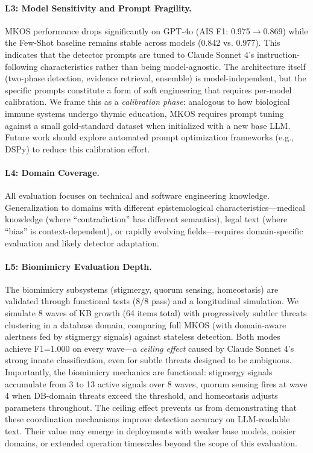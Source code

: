 \documentclass[11pt]{article}
\begin{document}
\paragraph{L3: Model Sensitivity and Prompt Fragility.} MKOS performance drops significantly on GPT-4o (AIS F1: 0.975$\to$0.869) while the Few-Shot baseline remains stable across models (0.842 vs. 0.977). This indicates that the detector prompts are tuned to Claude Sonnet 4's instruction-following characteristics rather than being model-agnostic. The architecture itself (two-phase detection, evidence retrieval, ensemble) is model-independent, but the specific prompts constitute a form of soft engineering that requires per-model calibration. We frame this as a \emph{calibration phase}: analogous to how biological immune systems undergo thymic education, MKOS requires prompt tuning against a small gold-standard dataset when initialized with a new base LLM. Future work should explore automated prompt optimization frameworks (e.g., DSPy) to reduce this calibration effort.

\paragraph{L4: Domain Coverage.} All evaluation focuses on technical and software engineering knowledge. Generalization to domains with different epistemological characteristics---medical knowledge (where ``contradiction'' has different semantics), legal text (where ``bias'' is context-dependent), or rapidly evolving fields---requires domain-specific evaluation and likely detector adaptation.

\paragraph{L5: Biomimicry Evaluation Depth.} The biomimicry subsystems (stigmergy, quorum sensing, homeostasis) are validated through functional tests (8/8 pass) and a longitudinal simulation. We simulate 8 waves of KB growth (64 items total) with progressively subtler threats clustering in a database domain, comparing full MKOS (with domain-aware alertness fed by stigmergy signals) against stateless detection. Both modes achieve F1=1.000 on every wave---a \emph{ceiling effect} caused by Claude Sonnet 4's strong innate classification, even for subtle threats designed to be ambiguous. Importantly, the biomimicry mechanics are functional: stigmergy signals accumulate from 3 to 13 active signals over 8 waves, quorum sensing fires at wave 4 when DB-domain threats exceed the threshold, and homeostasis adjusts parameters throughout. The ceiling effect prevents us from demonstrating that these coordination mechanisms improve detection accuracy on LLM-readable text. Their value may emerge in deployments with weaker base models, noisier domains, or extended operation timescales beyond the scope of this evaluation.
\end{document}
